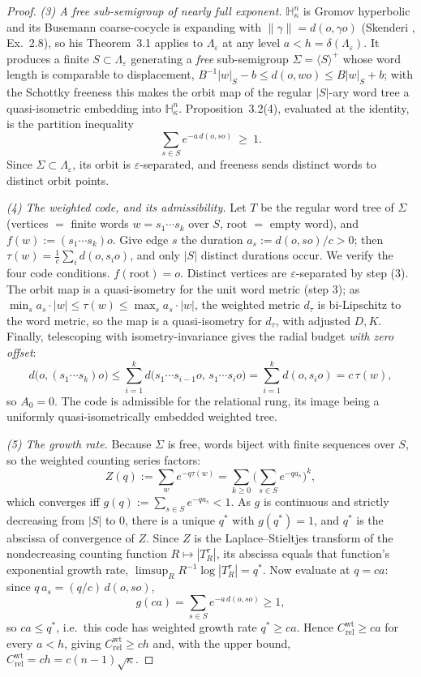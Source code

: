 \documentclass[11pt,reqno]{amsart}
\theoremstyle{plain}
\theoremstyle{definition}
\newcommand{\Crel}{C_{\mathrm{rel}}}
\newcommand{\Hk}{\mathbb{H}^n_\kappa}
\newcommand{\eps}{\varepsilon}
\begin{document}
\begin{proof}
\emph{(3) A free sub-semigroup of nearly full exponent.} $\Hk$ is Gromov hyperbolic and its Busemann coarse-cocycle is expanding with $\|\gamma\|=d(o,\gamma o)$ (Skenderi \cite{skenderi2026}, Ex.~2.8), so his Theorem~3.1 applies to $\Lambda_\eps$ at any level $a<h=\delta(\Lambda_\eps)$. It produces a finite $S\subset\Lambda_\eps$ generating a \emph{free} sub-semigroup $\Sigma=\langle S\rangle^+$ whose word length is comparable to displacement, $B^{-1}|w|_S-b\le d(o,wo)\le B|w|_S+b$; with the Schottky freeness this makes the orbit map of the regular $|S|$-ary word tree a quasi-isometric embedding into $\Hk$. Proposition~3.2(4), evaluated at the identity, is the partition inequality
\[
\sum_{s\in S}e^{-a\,d(o,so)}\ \ge\ 1 .
\]
Since $\Sigma\subset\Lambda_\eps$, its orbit is $\eps$-separated, and freeness sends distinct words to distinct orbit points.

\emph{(4) The weighted code, and its admissibility.} Let $T$ be the regular word tree of $\Sigma$ (vertices $=$ finite words $w=s_1\cdots s_k$ over $S$, root $=$ empty word), and $f(w):=(s_1\cdots s_k)o$. Give edge $s$ the duration $a_s:=d(o,so)/c>0$; then $\tau(w)=\frac1c\sum_i d(o,s_io)$, and only $|S|$ distinct durations occur. We verify the four code conditions. $f(\mathrm{root})=o$. Distinct vertices are $\eps$-separated by step (3). The orbit map is a quasi-isometry for the unit word metric (step 3); as $\min_s a_s\cdot|w|\le\tau(w)\le\max_s a_s\cdot|w|$, the weighted metric $d_\tau$ is bi-Lipschitz to the word metric, so the map is a quasi-isometry for $d_\tau$, with adjusted $D,K$. Finally, telescoping with isometry-invariance gives the radial budget \emph{with zero offset}:
\[
d\big(o,(s_1\cdots s_k)o\big)\le\sum_{i=1}^k d\big(s_1\cdots s_{i-1}o,\,s_1\cdots s_io\big)=\sum_{i=1}^k d(o,s_io)=c\,\tau(w),
\]
so $A_0=0$. The code is admissible for the relational rung, its image being a uniformly quasi-isometrically embedded weighted tree.

\emph{(5) The growth rate.} Because $\Sigma$ is free, words biject with finite sequences over $S$, so the weighted counting series factors:
\[
Z(q):=\sum_{w}e^{-q\tau(w)}=\sum_{k\ge0}\Big(\sum_{s\in S}e^{-q a_s}\Big)^{k},
\]
which converges iff $g(q):=\sum_{s\in S}e^{-qa_s}<1$. As $g$ is continuous and strictly decreasing from $|S|$ to $0$, there is a unique $q^{*}$ with $g(q^{*})=1$, and $q^{*}$ is the abscissa of convergence of $Z$. Since $Z$ is the Laplace--Stieltjes transform of the nondecreasing counting function $R\mapsto|T_R^\tau|$, its abscissa equals that function's exponential growth rate, $\limsup_R R^{-1}\log|T_R^\tau|=q^{*}$. Now evaluate at $q=ca$: since $q\,a_s=(q/c)\,d(o,so)$,
\[
g(ca)=\sum_{s\in S}e^{-a\,d(o,so)}\ge1,
\]
so $ca\le q^{*}$, i.e.\ this code has weighted growth rate $q^{*}\ge ca$. Hence $\Crel^{\mathrm{wt}}\ge ca$ for every $a<h$, giving $\Crel^{\mathrm{wt}}\ge ch$ and, with the upper bound, $\Crel^{\mathrm{wt}}=ch=c(n-1)\sqrt\kappa$.
\end{proof}
\end{document}
